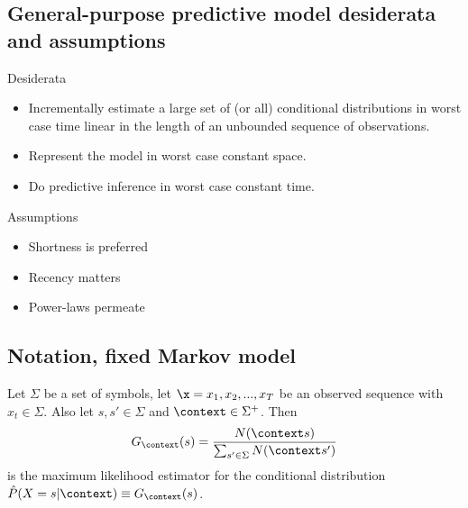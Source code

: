 \documentclass[16pt]{beamer}
\begin{document}
\begin{frame}[t]{}
{}



\subsection{General-purpose predictive model desiderata and assumptions}
\begin{frame}[t]{}
Desiderata
\begin{itemize}
\item Incrementally estimate a large set of (or all) conditional distributions in worst case time linear in the length of an unbounded sequence of observations.
\item Represent the model in worst case constant space.
\item Do predictive inference in worst case constant time.
\end{itemize}
Assumptions
\begin{itemize}
\item Shortness is preferred
\item Recency matters
\item Power-laws permeate
\end{itemize}
\end{frame}	

\subsection{Notation, fixed Markov model}
\begin{frame}[t]{}
Let $\Sigma$ be a set of symbols, let $\x = x_1, x_2, ..., x_T$ be an observed sequence with $x_t \in \Sigma$.  Also let $s,s' \in \Sigma$ and $\context \in \Sigma^+$.  Then
\begin{align*}
G_\context(s)=\frac{N(\context s)}{\sum_{s'\in\Sigma}N(\context s')}\label{eqn:mll}
\end{align*}
is the maximum likelihood estimator for the conditional distribution ${\hat P}(X=s|\context) \equiv G_\context(s)$.
\vspace{.5cm}


\end{frame}
\end{frame}
\end{document}
